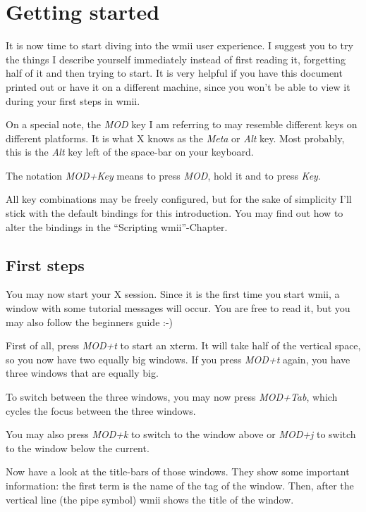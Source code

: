 \documentclass[12pt,a4paper]{article}
\begin{document}
\section{Getting started}

  It is now time to start diving into the wmii user experience. I
  suggest you to try the things I describe yourself immediately
  instead of first reading it, forgetting half of it and then trying
  to start. It is very helpful if you have this document printed out
  or have it on a different machine, since you won't be able to view
  it during your first steps in wmii.

  On a special note, the \emph{MOD} key I am referring to may resemble
  different keys on different platforms. It is what X knows as the
  \emph{Meta} or \emph{Alt} key. Most probably, this is the \emph{Alt}
  key left of the space-bar on your keyboard.

  The notation \emph{MOD+Key} means to press \emph{MOD}, hold it and
  to press \emph{Key}.

  All key combinations may be freely configured, but for the sake of
  simplicity I'll stick with the default bindings for this
  introduction. You may find out how to alter the bindings in the
  ``Scripting wmii''-Chapter.

  \subsection{First steps}

    You may now start your X session. Since it is the first time you
    start wmii, a window with some tutorial messages will occur. You
    are free to read it, but you may also follow the beginners guide
    :-)

    First of all, press \emph{MOD+t} to start an xterm. It will take
    half of the vertical space, so you now have two equally big
    windows. If you press \emph{MOD+t} again, you have three windows
    that are equally big.

    To switch between the three windows, you may now press
    \emph{MOD+Tab}, which cycles the focus between the three windows.

    You may also press \emph{MOD+k} to switch to the window above or
    \emph{MOD+j} to switch to the window below the current.

    Now have a look at the title-bars of those windows. They show some
    important information: the first term is the name of the tag of
    the window. Then, after the vertical line (the pipe symbol) wmii
    shows the title of the window.
\end{document}
